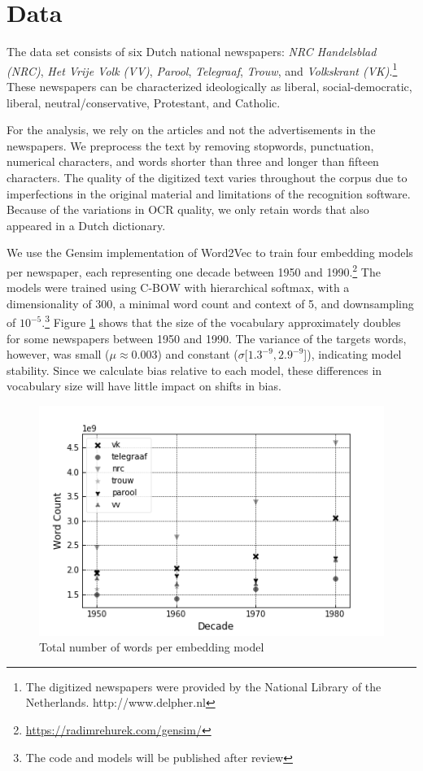 \documentclass[11pt,a4paper]{article}
\begin{document}
\section{Data}
The data set consists of six Dutch national newspapers: \textit{NRC Handelsblad (NRC)}, \textit{Het Vrije Volk (VV)}, \textit{Parool}, \textit{Telegraaf}, \textit{Trouw}, and \textit{Volkskrant (VK)}.\footnote{ The digitized newspapers were provided by the National Library of the Netherlands. http://www.delpher.nl} These newspapers can be characterized ideologically as liberal, social-democratic, liberal, neutral/conservative, Protestant, and Catholic.

For the analysis, we rely on the articles and not the advertisements in the newspapers. We preprocess the text by removing stopwords, punctuation, numerical characters, and words shorter than three and longer than fifteen characters. 
The quality of the digitized text varies throughout the corpus due to imperfections in the original material and limitations of the recognition software. Because of the variations in OCR quality, we only retain words that also appeared in a Dutch dictionary.

We use the Gensim implementation of Word2Vec to train four embedding models per newspaper, each representing one decade between 1950 and 1990.\footnote{\url{https://radimrehurek.com/gensim/}} The models were trained using C-BOW with hierarchical softmax, with a dimensionality of 300, a minimal word count and context of 5, and downsampling of $10^{-5}$.\footnote{The code and models will be published after review} Figure \ref{fig:vocab-size} shows that the size of the vocabulary approximately doubles for some newspapers between 1950 and 1990. The variance of the targets words, however, was small ($\mu \approx 0.003$) and constant ($\sigma [1.3^{-9}, 2.9^{-9}$]), indicating model stability. Since we calculate bias relative to each model, these differences in vocabulary size will have little impact on shifts in bias.

\begin{figure}
  \includegraphics[width=\linewidth]{figures/vocab_size}
  \caption{Total number of words per embedding model}
  \label{fig:vocab-size}
\end{figure}
\end{document}
